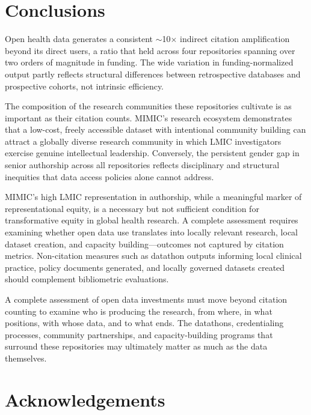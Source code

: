 \documentclass[11pt]{article}
\begin{document}
\section{Conclusions}
\label{sec:conclusion}

Open health data generates a consistent ${\sim}$10$\times$ indirect citation amplification beyond its direct users, a ratio that held across four repositories spanning over two orders of magnitude in funding.
The wide variation in funding-normalized output partly reflects structural differences between retrospective databases and prospective cohorts, not intrinsic efficiency.

The composition of the research communities these repositories cultivate is as important as their citation counts.
MIMIC's research ecosystem demonstrates that a low-cost, freely accessible dataset with intentional community building can attract a globally diverse research community in which LMIC investigators exercise genuine intellectual leadership.
Conversely, the persistent gender gap in senior authorship across all repositories reflects disciplinary and structural inequities that data access policies alone cannot address.

MIMIC's high LMIC representation in authorship, while a meaningful marker of representational equity, is a necessary but not sufficient condition for transformative equity in global health research. A complete assessment requires examining whether open data use translates into locally relevant research, local dataset creation, and capacity building---outcomes not captured by citation metrics. Non-citation measures such as datathon outputs informing local clinical practice, policy documents generated, and locally governed datasets created should complement bibliometric evaluations.

A complete assessment of open data investments must move beyond citation counting to examine who is producing the research, from where, in what positions, with whose data, and to what ends.
The datathons, credentialing processes, community partnerships, and capacity-building programs that surround these repositories may ultimately matter as much as the data themselves.



\section*{Acknowledgements}
\end{document}
